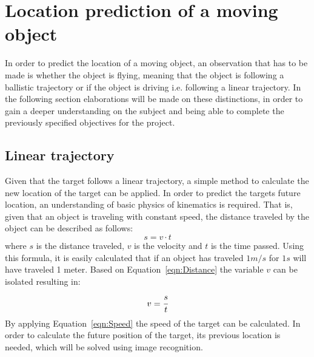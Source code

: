 \section{Location prediction of a moving object}
In order to predict the location of a moving object, an observation that has to be made is whether the object is flying, meaning that the object is following a ballistic trajectory or if the object is driving i.e{.} following a linear trajectory. 
In the following section elaborations will be made on these distinctions, in order to gain a deeper understanding on the subject and being able to complete the previously specified objectives for the project. 
\subsection{Linear trajectory}
Given that the target follows a linear trajectory, a simple method to calculate the new location of the target can be applied.  
In order to predict the targets future location, an understanding of basic physics of kinematics is required. 
That is, given that an object is traveling with constant speed, the distance traveled by the object can be described as follows:
\begin{equation}\label{eqn:Distance}
s = v \cdot t
\end{equation}
where $ s $ is the distance traveled, $ v $ is the velocity and $ t $ is the time passed.
Using this formula, it is easily calculated that if an object has traveled $ 1 m/s $ for $ 1 s $ will have traveled 1 meter. 
Based on Equation~\ref{eqn:Distance} the variable $ v $ can be isolated resulting in:
\begin{equation}\label{eqn:Speed}
v = \cfrac{s}{t}
\end{equation}
By applying Equation~\ref{eqn:Speed} the speed of the target can be calculated. 
In order to calculate the future position of the target, its previous location is needed, which will be solved using image recognition.

%
